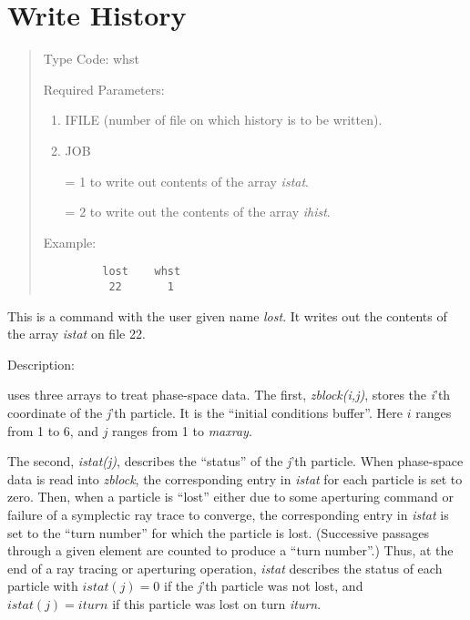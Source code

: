 \section{Write History}
\begin{quotation}
\noindent Type Code:  whst
\vspace{5mm}

\noindent Required Parameters:
\begin{enumerate}
      \item  IFILE (number of file on which history is to be written).
      \item  JOB

              = 1 to write out contents of the array {\em istat}.

              = 2 to write out the contents of the array {\em ihist}.
\end{enumerate}

\vspace{5mm}
\noindent Example:
\begin{verbatim}
         lost    whst
          22       1
\end{verbatim}
\end{quotation}
This is a command with the user given name {\em lost}.  It writes out
the contents of the array {\em istat} on file 22.

\vspace{5mm}
     Description:
\vspace{2mm}

\Mary uses three arrays to treat phase-space data.  The first, {\em zblock(i,j)}, stores the {\em i}'th coordinate of the {\em j}'th particle.  It is the ``initial conditions buffer''.  Here $i$ ranges from 1 to 6, and $j$ ranges from 1 to {\em maxray}.

The second, {\em istat(j)}, describes the ``status'' of the {\em j}'th particle.  When phase-space data is read into {\em zblock}, the corresponding entry in {\em istat} for each particle is set to zero.  Then, when a particle is ``lost'' either due to some aperturing command or failure of a symplectic ray trace to converge, the corresponding entry in {\em istat} is set to the ``turn number'' for which the particle is lost.  (Successive passages through a given element are counted to produce a ``turn number''.)  Thus, at the end of a ray tracing or aperturing operation, {\em istat} describes the status of each particle with $istat(j) = 0$ if the {\em j}'th particle was not lost, and $istat(j) = iturn$ if this particle was lost on turn {\em  iturn}.

